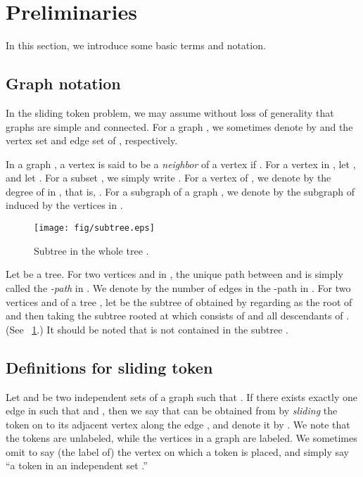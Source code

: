 \documentclass{llncs}
\newcounter{one}
\newcounter{two}
\begin{document}
\section{Preliminaries}

In this section, we introduce some basic terms and notation. 

\subsection{Graph notation}

In the {\sc sliding token} problem, 
we may assume without loss of generality that graphs are simple and connected.
For a graph , we sometimes denote by  and  the vertex set and edge set of , respectively. 

	In a graph , a vertex  is said to be a {\em neighbor} of a vertex  if . 
	For a vertex  in , let , and let .
	For a subset , we simply write . 
	For a vertex  of , we denote by  the degree of  in , that is, .
	For a subgraph  of a graph , we denote by  the subgraph of  induced by the vertices in . 

\begin{figure}[t]
\begin{center}
\texttt{[image: fig/subtree.eps]}
\end{center}
\vspace{-1em}
\caption{Subtree  in the whole tree .}
\label{fig:subtree}
\end{figure}

	Let  be a tree. 
	For two vertices  and  in , the unique path between  and  is simply called the {\em -path} in . 
	We denote by  the number of edges in the -path in .
	For two vertices  and  of a tree , let  be the subtree of  obtained by regarding  as the root of  and then taking the subtree rooted at  which consists of  and all descendants of .
(See \figurename~\ref{fig:subtree}.)
	It should be noted that  is not contained in the subtree . 

\subsection{Definitions for {\sc sliding token}}

Let  and  be two independent sets of a graph  such that . 
If there exists exactly one edge  in  such that  
and , 
then we say that  can be obtained from  by {\em sliding} 
the token on  to its adjacent vertex  along the edge , 
and denote it by . 
We note that the tokens are unlabeled, while the vertices in a graph are labeled.
	We sometimes omit to say (the label of) the vertex on which a token is placed, and simply say ``a token in an independent set .''
\end{document}

